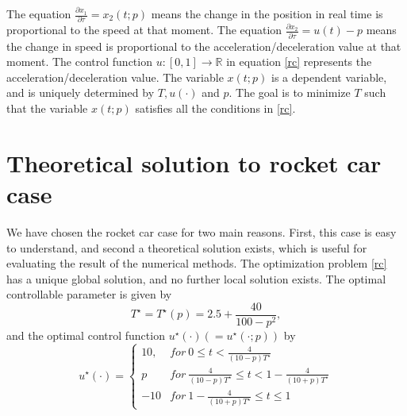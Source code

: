 \documentclass  [
  paper    = a4,
  BCOR     = 10mm,
  twoside,
  fontsize = 12pt,
  fleqn,
  toc      = bibnumbered,
  toc      = listofnumbered,
  numbers  = noendperiod,
  headings = normal,
  listof   = leveldown,
  version  = 3.03
]                                       {scrreprt}
\newcommand{\<}{\langle}
\renewcommand{\>}{\rangle}
\begin{document}
The equation $\frac{\partial x_1}{\partial \tau}= x_2(t;p) $ means the change in the position in real time is proportional to the speed at that moment. The equation $\frac{\partial x_2}{\partial \tau} = u(t)-p $ means the change in speed is proportional to the acceleration/deceleration value at that moment. 
The control function $ u: [0,1] \rightarrow \mathbb{R}$ in equation \ref{rc} represents the acceleration/deceleration value. The variable $x(t;p)$ is a dependent variable, and is uniquely determined by $T, u(\cdot)$ and $p$. The goal is to minimize $T$ such that the variable $x(t;p)$ satisfies all the conditions in \ref{rc}. 

\section{Theoretical solution to rocket car case}
 We have chosen the rocket car case for two main reasons. First, this case is easy to understand, and second a theoretical solution exists, which is useful for evaluating the result of the numerical methods. 
The optimization problem \ref{rc} has a unique global solution, and no further local solution exists. The optimal controllable parameter is given by 
\begin{equation}
	T^\star = T^\star(p) = 2.5 + \frac{40}{100-p^2},
\end{equation}
and the optimal control function $u^\star(\cdot) (= u^\star(\cdot; p))$ by 
\begin{equation}
	u^\star(\cdot) =     \left\{
	\begin{array}{ll}
		10, & for \  0 \leq t <  \frac{4}{(10-p)T^\star}\\
		p  &  for \ \frac{4}{(10-p)T^\star} \leq t < 1- \frac{4}{(10+p)T^\star} \\
		-10  & for \  1- \frac{4}{(10+p)T^\star} \leq t \leq 1 
	\end{array}
	\right.
\end{equation}
\end{document}
